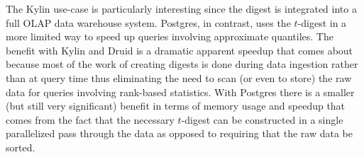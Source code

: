 \documentclass[preprint,12pt, a4paper]{elsarticle}
\begin{document}
The Kylin use-case is particularly interesting since the digest is integrated into a full OLAP data warehouse system. Postgres\cite{postgres-t-digest}, in contrast, uses the $t$-digest in a more limited way to speed up queries involving approximate quantiles. The benefit with Kylin and Druid is a dramatic apparent speedup that comes about because most of the work of creating digests is done during data ingestion rather than at query time thus eliminating the need to scan (or even to store) the raw data for queries involving rank-based statistics. With Postgres there is a smaller (but still very significant) benefit in terms of memory usage and speedup that comes from the fact that the necessary $t$-digest can be constructed in a single parallelized pass through the data as opposed to requiring that the raw data be sorted.
\end{document}
